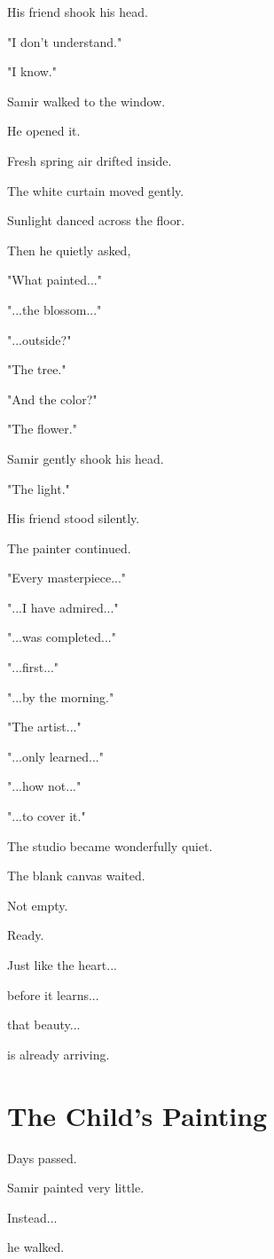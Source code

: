 \documentclass[12pt,openany]{book}
\begin{document}
His friend shook his head.

"I don't understand."

"I know."

Samir walked to the window.

He opened it.

Fresh spring air drifted inside.

The white curtain moved gently.

Sunlight danced across the floor.

Then he quietly asked,

"What painted..."

"...the blossom..."

"...outside?"

"The tree."

"And the color?"

"The flower."

Samir gently shook his head.

"The light."

His friend stood silently.

The painter continued.

"Every masterpiece..."

"...I have admired..."

"...was completed..."

"...first..."

"...by the morning."

"The artist..."

"...only learned..."

"...how not..."

"...to cover it."

The studio became wonderfully quiet.

The blank canvas waited.

Not empty.

Ready.

Just like the heart...

before it learns...

that beauty...

is already arriving.
\section*{The Child's Painting}

Days passed.

Samir painted very little.

Instead...

he walked.
\end{document}
